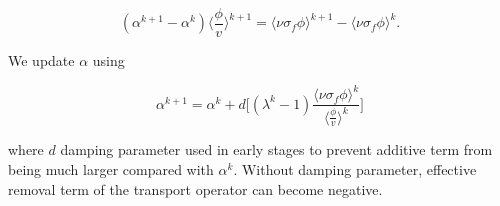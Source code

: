 \documentclass{article}
\begin{document}
\begin{equation*}
(\alpha^{k+1} - \alpha^k) \bigg \langle \frac{\phi}{v} \bigg \rangle^{k+1} = \langle \nu \sigma_f \phi \rangle^{k+1} - \langle \nu \sigma_f \phi \rangle^{k}.
\end{equation*}

We update $\alpha$ using

\begin{equation*}
\alpha^{k+1} = \alpha^{k} + d \bigg [ (\lambda^k - 1) \frac{\langle \nu \sigma_f \phi \rangle^{k}}{\bigg \langle \frac{\phi}{v} \bigg \rangle^{k}} \bigg ]
\end{equation*}

where $d$ damping parameter used in early stages to prevent additive term from being much larger compared with $\alpha^k$. Without damping parameter, effective removal term of the transport operator can become negative. 
\end{document}
